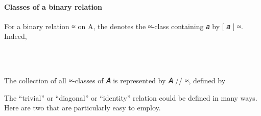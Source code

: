 \documentclass[a4paper,UKenglish,cleveref, autoref, thm-restate]{lipics-v2019}
\begin{document}
\paragraph*{Classes of a binary relation}
For a binary relation ≈ on A, the \agdaualib denotes the ≈-class containing 𝑎 by {[} 𝑎 {]} ≈. Indeed,
\begin{code}
\\[\AgdaEmptyExtraSkip]%
\>[0]\AgdaOperator{\AgdaFunction{[\AgdaUnderscore{}]\AgdaUnderscore{}}}\AgdaSpace{}%
\AgdaSymbol{:}%
\>[8]\AgdaSymbol{\{}\AgdaSpace{}%
\AgdaSymbol{:}\AgdaSpace{}%
\AgdaSpace{}%
\AgdaSpace{}%
\AgdaSymbol{\}}\AgdaSpace{}%
%
\>[22]\AgdaSymbol{(}\AgdaSpace{}%
\AgdaSymbol{:}\AgdaSpace{}%
\AgdaSymbol{)}\AgdaSpace{}%
\AgdaSpace{}%
\AgdaSpace{}%
\AgdaSpace{}%
\AgdaSpace{}%
\AgdaSpace{}%
\AgdaSpace{}%
\AgdaSpace{}%
\AgdaSpace{}%
\<%
\\
\>[0]\AgdaOperator{\AgdaFunction{[}}\AgdaSpace{}%
\AgdaSpace{}%
\AgdaOperator{\AgdaFunction{]}}\AgdaSpace{}%
\AgdaSpace{}%
\AgdaSymbol{=}\AgdaSpace{}%
\AgdaSpace{}%
\AgdaSpace{}%
\AgdaSpace{}%
\AgdaSymbol{\AgdaUnderscore{}}\AgdaSpace{}%
\AgdaFunction{,}%
\>[21]\AgdaSpace{}%
\AgdaSpace{}%
\<%
\end{code}
The collection of all ≈-classes of 𝐴 is represented by 𝐴 // ≈, defined by
\begin{code}\end{code}
The ``trivial'' or ``diagonal'' or ``identity'' relation could be defined in many ways.  Here are two that are particularly easy to employ.
\end{document}
